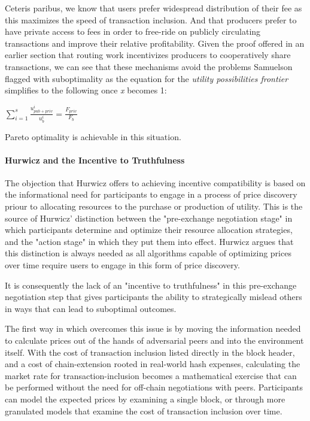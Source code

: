 {Ceteris paribus, we know that users prefer widespread distribution of their fee as this maximizes the speed of transaction inclusion. And that producers prefer to have private access to fees in order to free-ride on publicly circulating transactions and improve their relative profitability. Given the proof offered in an earlier section that routing work incentivizes producers to cooperatively share transactions, we can see that these mechanisms avoid the problems Samuelson flagged with suboptimality as the equation for the \textit{utility possibilities frontier} simplifies to the following once \textit{x} becomes 1:

\LARGE
\begin{adjustwidth}{1.5em}{1.5em}
\begin{math}
\sum_{i=1}^{s} \frac{u_{{pub}+{priv}}^i}{u_b^i} = \frac{F_{{priv}}}{F_b}
\end{math}
\end{adjustwidth}
\normalsize

Pareto optimality is achievable in this situation.


\paragraph{Hurwicz and the Incentive to Truthfulness}

The objection that Hurwicz offers to achieving incentive compatibility is based on the informational need for participants to engage in a process of price discovery priour to allocating resources to the purchase or production of utility. This is the source of Hurwicz' distinction between the "pre-exchange negotiation stage" in which participants determine and optimize their resource allocation strategies, and the "action stage" in which they put them into effect. Hurwicz argues that this distinction is always needed as all algorithms capable of optimizing prices over time require users to engage in this form of price discovery.

It is consequently the lack of an "incentive to truthfulness" in this pre-exchange negotiation step that gives participants the ability to strategically mislead others in ways that can lead to suboptimal outcomes. 

The first way in which \ourTFM overcomes this issue is by moving the information needed to calculate prices out of the hands of adversarial peers and into the environment itself. With the cost of transaction inclusion listed directly in the block header, and a cost of chain-extension rooted in real-world hash expenses, calculating the market rate for transaction-inclusion becomes a mathematical exercise that can be performed without the need for off-chain negotiations with peers. Participants can model the expected prices by examining a single block, or through more granulated models that examine the cost of transaction inclusion over time.

}
